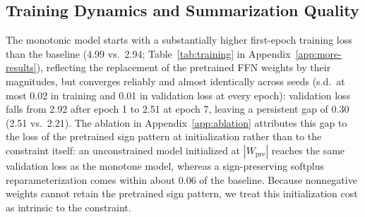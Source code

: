 \documentclass{article}
\theoremstyle{plain}
\theoremstyle{definition}
\theoremstyle{remark}
\theoremstyle{plain}
\begin{document}
\subsection{Training Dynamics and Summarization Quality}
\label{sec:results-quality}
The monotonic model starts with a substantially higher first-epoch training loss than the baseline (4.99 vs.\ 2.94; Table~\ref{tab:training} in Appendix~\ref{app:more-results}), reflecting the replacement of the pretrained FFN weights by their magnitudes, but converges reliably and almost identically across seeds (s.d.\ at most 0.02 in training and 0.01 in validation loss at every epoch): validation loss falls from 2.92 after epoch 1 to 2.51 at epoch 7, leaving a persistent gap of 0.30 (2.51 vs.\ 2.21). The ablation in Appendix~\ref{app:ablation} attributes this gap to the loss of the pretrained sign pattern at initialization rather than to the constraint itself: an unconstrained model initialized at $|W_{\mathrm{pre}}|$ reaches the same validation loss as the monotone model, whereas a sign-preserving softplus reparameterization comes within about 0.06 of the baseline. Because nonnegative weights cannot retain the pretrained sign pattern, we treat this initialization cost as intrinsic to the constraint.
\end{document}
